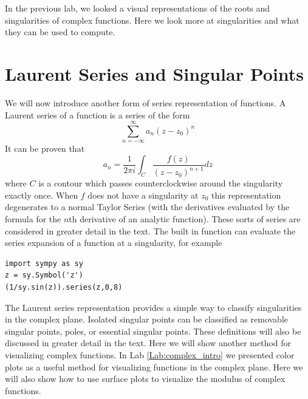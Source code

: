 

In the previous lab, we looked a visual representations of the roots and singularities of complex functions. Here we look more at singularities and what they can be used to compute.

\section*{Laurent Series and Singular Points}

We will now introduce another form of series representation of functions.
A Laurent series of a function is a series of the form
\[\sum_{n= -\infty}^{\infty} a_n (z-z_0)^n\]
It can be proven that
\[a_n = \frac{1}{2\pi i} \int_C \frac{f(z)}{(z-z_0)^{n+1}} dz\]
where $C$ is a contour which passes counterclockwise around the singularity exactly once.
When $f$ does not have a singularity at $z_0$ this representation degenerates to a normal Taylor Series (with the derivatives evaluated by the formula for the $n$th derivative of an analytic function).
These sorts of series are considered in greater detail in the text.
The built in function  can evaluate the series expansion of a function at a singularity, for example
\begin{lstlisting}
import sympy as sy
z = sy.Symbol('z')
(1/sy.sin(z)).series(z,0,8)
\end{lstlisting}

The Laurent series representation provides a simple way to classify singularities in the complex plane.
Isolated singular points can be classified as removable singular points, poles, or essential singular points.
These definitions will also be discussed in greater detail in the text.
Here we will show another method for visualizing complex functions.
In Lab \ref{Lab:complex_intro} we presented color plots as a useful method for visualizing functions in the complex plane. 
Here we will also show how to use surface plots to visualize the modulus of complex functions.

